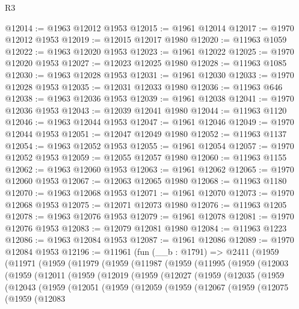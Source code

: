\begin{lexlean}{R3}
\begin{coremodule}
@12014 := @1963 @12012 @1953
@12015 := @1961 @12014
@12017 := @1970 @12012 @1953
@12019 := @12015 @12017 @1980
@12020 := @11963 @1059
@12022 := @1963 @12020 @1953
@12023 := @1961 @12022
@12025 := @1970 @12020 @1953
@12027 := @12023 @12025 @1980
@12028 := @11963 @1085
@12030 := @1963 @12028 @1953
@12031 := @1961 @12030
@12033 := @1970 @12028 @1953
@12035 := @12031 @12033 @1980
@12036 := @11963 @646
@12038 := @1963 @12036 @1953
@12039 := @1961 @12038
@12041 := @1970 @12036 @1953
@12043 := @12039 @12041 @1980
@12044 := @11963 @1120
@12046 := @1963 @12044 @1953
@12047 := @1961 @12046
@12049 := @1970 @12044 @1953
@12051 := @12047 @12049 @1980
@12052 := @11963 @1137
@12054 := @1963 @12052 @1953
@12055 := @1961 @12054
@12057 := @1970 @12052 @1953
@12059 := @12055 @12057 @1980
@12060 := @11963 @1155
@12062 := @1963 @12060 @1953
@12063 := @1961 @12062
@12065 := @1970 @12060 @1953
@12067 := @12063 @12065 @1980
@12068 := @11963 @1180
@12070 := @1963 @12068 @1953
@12071 := @1961 @12070
@12073 := @1970 @12068 @1953
@12075 := @12071 @12073 @1980
@12076 := @11963 @1205
@12078 := @1963 @12076 @1953
@12079 := @1961 @12078
@12081 := @1970 @12076 @1953
@12083 := @12079 @12081 @1980
@12084 := @11963 @1223
@12086 := @1963 @12084 @1953
@12087 := @1961 @12086
@12089 := @1970 @12084 @1953
@12196 := @11961
    (fun (__b : @1791) =>
    @2411
      (@1959
        (@11971
          (@1959
            (@11979
              (@1959
                (@11987
                  (@1959
                    (@11995
                      (@1959
                        (@12003
                          (@1959
                            (@12011
                              (@1959
                                (@12019
                                  (@1959
                                    (@12027
                                      (@1959
                                        (@12035
                                          (@1959
                                            (@12043
                                              (@1959
                                                (@12051
                                                  (@1959
                                                    (@12059
                                                      (@1959
                                                        (@12067
                                                          (@1959
                                                            (@12075
                                                              (@1959
                                                                (@12083

\end{coremodule}
\end{lexlean}
